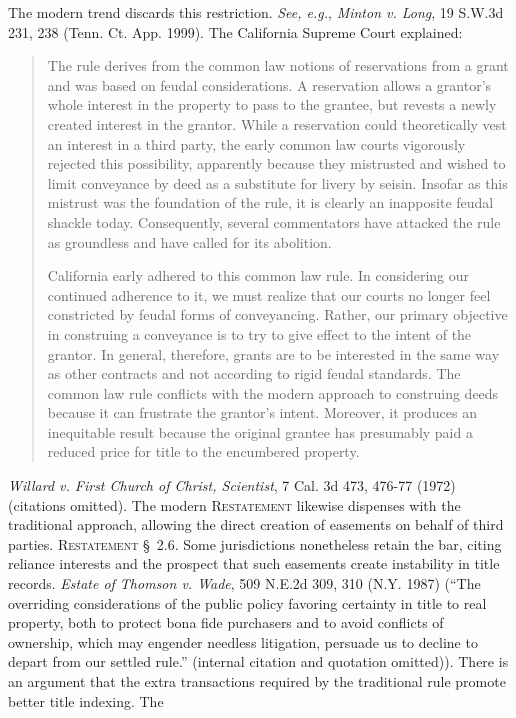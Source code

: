 The modern trend discards this restriction. \textit{See, e.g.}, \emph{Minton v.
Long}, 19 S.W.3d 231, 238 (Tenn. Ct. App. 1999). The California Supreme Court
explained:
\begin{quotation}
The rule derives from the common law notions of reservations from a grant and
was based on feudal considerations. A reservation allows a grantor's whole
interest in the property to pass to the grantee, but revests a newly created
interest in the grantor. While a reservation could theoretically vest an
interest in a third party, the early common law courts vigorously rejected this
possibility, apparently because they mistrusted and wished to limit conveyance
by deed as a substitute for livery by seisin. Insofar as this mistrust was the
foundation of the rule, it is clearly an inapposite feudal shackle today.
Consequently, several commentators have attacked the rule as groundless and have
called for its abolition. 

California early adhered to this common law rule. In considering our continued
adherence to it, we must realize that our courts no longer feel constricted by
feudal forms of conveyancing. Rather, our primary objective in construing a
conveyance is to try to give effect to the intent of the grantor. In general,
therefore, grants are to be interested in the same way as other contracts and
not according to rigid feudal standards. The common law rule conflicts with the
modern approach to construing deeds because it can frustrate the grantor's
intent. Moreover, it produces an inequitable result because the original grantee
has presumably paid a reduced price for title to the encumbered property.
\end{quotation}
\emph{Willard v. First Church of Christ, Scientist}, 7 Cal. 3d 473, 476-77
(1972) (citations omitted). The modern \textsc{Restatement} likewise dispenses
with the traditional approach, allowing the direct creation of easements on
behalf of third parties. \textsc{Restatement} \S~2.6. Some jurisdictions
nonetheless retain the bar, citing reliance interests and the prospect that such
easements create instability in title records. \emph{Estate of Thomson v. Wade},
509 N.E.2d 309, 310 (N.Y. 1987) (``The overriding considerations of the public
policy favoring certainty in title to real property, both to protect bona fide
purchasers and to avoid conflicts of ownership, which may engender needless
litigation, persuade us to decline to depart from our settled rule.'' (internal
citation and quotation omitted)). There is an argument that the extra
transactions required by the traditional rule promote better title indexing. The
